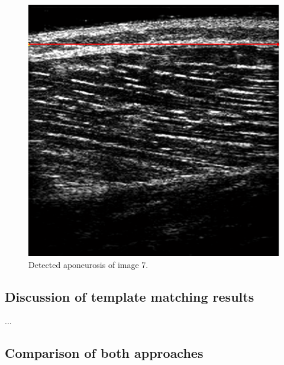 \documentclass[10pt,twocolumn,letterpaper]{article}
\begin{document}
\begin{figure}
	\begin{center}		
		\includegraphics[width=1\linewidth]{img/im7_hough_apo}
	\end{center}
	\caption{Detected aponeurosis of image 7.}
	\label{fig:im7_hough_apo}
	
\end{figure}

\subsection{Discussion of template matching results}

...

\subsection{Comparison of both approaches}
\end{document}
